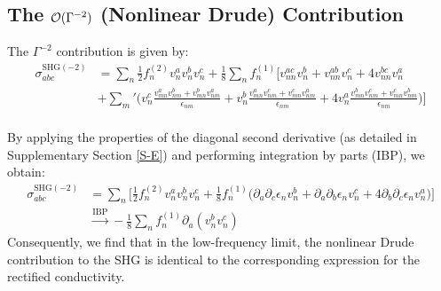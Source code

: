 \documentclass[twocolumn, prx, reprint, amsfonts, amsmath, amssymb, longbibliography, floatfix, aps]{revtex4-2}
\begin{document}
\subsection{The \texorpdfstring{${\cal O}(\Gamma^{-2})$}{O(Gamma-2)} (Nonlinear Drude) Contribution}
The $\Gamma^{-2}$ contribution is given by:
\begin{equation}
	\begin{aligned}
		\sigma^{\text{SHG}(-2)}_{abc} &=  {\textstyle \sum_{n}}\frac{1}{2}f^{(2)}_n v^a_n v^b_n v^c_n + \frac{1}{8} {\textstyle \sum_{n}} f^{(1)}_{n} \Big[ v^{ac}_{nn}v^b_{n} + v^{ab}_{nn}v^c_{n} + 4v^{bc}_{nn}v^a_{n}\\
		& + {\textstyle \sum_{m}'} \Big( v^c_{n}\frac{v^{a}_{mn}v^b_{nm} + v^{b}_{mn}v^a_{nm}}{\epsilon_{nm}} + v^b_{n}\frac{v^{a}_{mn}v^c_{nm} + v^{c}_{mn}v^a_{nm}}{\epsilon_{nm}} + 4v^a_{n}\frac{v^{b}_{mn}v^c_{nm} + v^{c}_{mn}v^b_{nm}}{\epsilon_{nm}}\Big) \Big] \\
	\end{aligned}
\end{equation}

By applying the properties of the diagonal second derivative (as detailed in Supplementary Section \ref{S-E}) and performing integration by parts (IBP), we obtain:
\begin{equation}
	\begin{aligned}
		\sigma^{\text{SHG}(-2)}_{abc} 
		&= {\textstyle \sum_{n}}\Big[\frac{1}{2}f^{(2)}_n v^a_n v^b_n v^c_n + \frac{1}{8} f^{(1)}_{n} \Big(\partial_a\partial_c \epsilon_n v^b_n + \partial_a\partial_b \epsilon_n v^c_n + 4\partial_b\partial_c \epsilon_n v^a_n\Big)\Big] \\
		&\xrightarrow{\text{IBP}}  -\frac{1}{8}{\textstyle \sum_{n}} f^{(1)}_n \partial_a(v^b_n v^c_n)
	\end{aligned}
\end{equation}
Consequently, we find that in the low-frequency limit, the nonlinear Drude contribution to the SHG is identical to the corresponding expression for the rectified conductivity.
\end{document}
